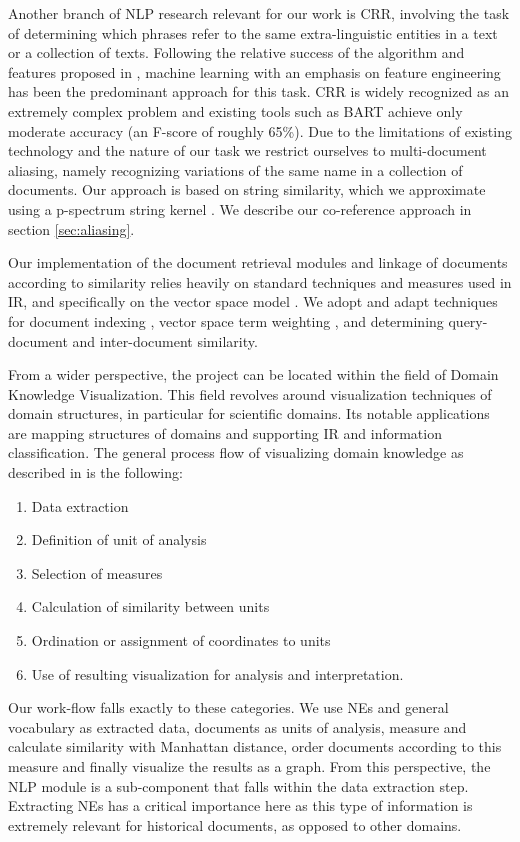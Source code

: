 Another branch of NLP research relevant for our work is CRR, involving the task of determining which phrases refer to the same extra-linguistic entities in a text or a collection of texts.
Following the relative success of the algorithm and features proposed in \cite {soon2001coreference}, machine learning 
with an emphasis on feature engineering has been the predominant approach for this task. CRR is widely 
recognized as an extremely complex problem and existing tools such as BART \cite{bart} achieve only moderate accuracy (an F-score of roughly 65\%). Due to the limitations of existing technology and the nature of our task we restrict ourselves to multi-document aliasing, namely recognizing variations of the same name in a collection of documents. Our approach is based on string similarity, 
which we approximate using a p-spectrum string kernel \cite{kernels2004}. We describe our co-reference approach in section \ref{sec:aliasing}.

Our implementation of the document retrieval modules and linkage of documents according to similarity relies heavily on standard techniques 
and measures used in IR, and specifically on the vector space model \cite{ir2008}. We adopt and adapt techniques for 
document indexing \cite{indexing1999}, vector space term weighting \cite{jones2004}, \cite{salton1971} and determining query-document and 
inter-document similarity. 

From a wider perspective, the project can be located within the field of Domain Knowledge Visualization. This field revolves around visualization
techniques of domain structures, in particular for scientific domains. Its notable applications are mapping structures of domains and supporting
IR and information classification.
The general process flow of visualizing domain knowledge as described in
\cite{visualizing2003} is the following: 
\begin{enumerate}
\item Data extraction 
\item Definition of unit of analysis 
\item Selection of measures 
\item Calculation of similarity between units 
\item Ordination or assignment of coordinates to units 
\item Use of resulting visualization for analysis and interpretation.
\end{enumerate}
Our work-flow falls exactly to these categories. We use NEs and general vocabulary as extracted data, documents as units of analysis, measure and calculate similarity with Manhattan distance, order documents according to this measure and finally visualize the results as a graph.
From this perspective, the NLP module is a sub-component that falls within the data extraction step. Extracting NEs has a critical importance
here as this type of information is extremely relevant for historical documents, as opposed to other domains.  

